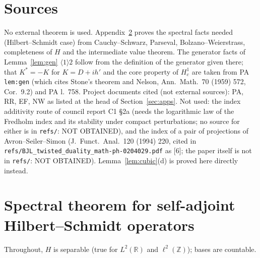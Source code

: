 \documentclass[11pt]{article}
\begin{document}
\section{Sources}\label{sec:sources}
No external theorem is used.  Appendix~\ref{app:spec} proves the spectral facts needed (Hilbert--Schmidt case) from
Cauchy--Schwarz, Parseval, Bolzano--Weierstrass, completeness of $H$ and the intermediate value theorem.  The
generator facts of Lemma~\ref{lem:gen} $\langle1\rangle2$ follow from the definition of the generator given there; that
$K^*=-K$ for $K=D+ih'$ and the core property of $H^1_c$ are taken from PA \texttt{lem:gen} (which cites Stone's
theorem and Nelson, Ann.\ Math.\ 70 (1959) 572, Cor.~9.2) and PA l.~758.
Project documents cited (not external sources): PA, RR, EF, NW as listed at the head of Section~\ref{sec:apps}.
Not used: the index additivity route of council report C1 \S2a (needs the logarithmic law of the Fredholm index and
its stability under compact perturbations; no source for either is in \texttt{refs/}: NOT OBTAINED), and the index of
a pair of projections of Avron--Seiler--Simon (J.\ Funct.\ Anal.\ 120 (1994) 220, cited in
\texttt{refs/BJL\_twisted\_duality\_math-ph-0204029.pdf} as [6]; the paper itself is not in \texttt{refs/}: NOT
OBTAINED).  Lemma~\ref{lem:cubic}(d) is proved here directly instead.

\appendix
\section{Spectral theorem for self-adjoint Hilbert--Schmidt operators}\label{app:spec}
Throughout, $H$ is separable (true for $L^2(\mathbb R)$ and $\ell^2(\mathbb Z)$); bases are countable.
\end{document}

